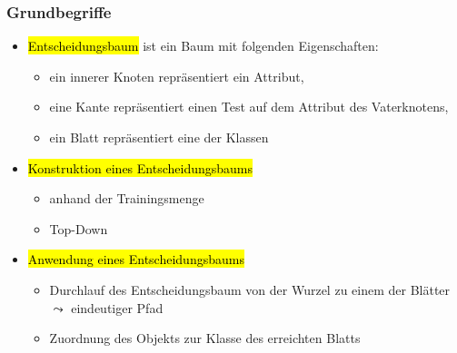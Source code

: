 
\begin{frame}
\frametitle{Grundbegriffe}

\begin{itemize}
\item \hl{Entscheidungsbaum} ist ein Baum mit folgenden Eigenschaften:
\begin{itemize}
\item ein innerer Knoten repräsentiert ein Attribut,
\item eine Kante repräsentiert einen Test auf dem Attribut des Vaterknotens,
\item ein Blatt repräsentiert eine der Klassen
\end{itemize}
\item \hl{Konstruktion eines Entscheidungsbaums}
\begin{itemize}
\item anhand der Trainingsmenge
\item Top-Down
\end{itemize}
\item \hl{Anwendung eines Entscheidungsbaums}
\begin{itemize}
\item Durchlauf des Entscheidungsbaum von der Wurzel zu einem der
  Blätter $\leadsto$ eindeutiger Pfad
 \item Zuordnung des Objekts zur Klasse des erreichten Blatts
\end{itemize}
\end{itemize}
\end{frame}



